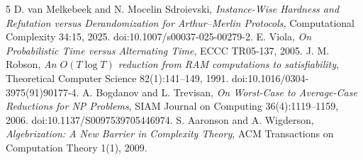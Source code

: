 \documentclass[11pt]{article}
\begin{document}
\begin{thebibliography}{5}
 D. van Melkebeek and N. Mocelin Sdroievski, \emph{Instance-Wise Hardness and Refutation versus Derandomization for Arthur--Merlin Protocols}, Computational Complexity 34:15, 2025. doi:10.1007/s00037-025-00279-2.
 E. Viola, \emph{On Probabilistic Time versus Alternating Time}, ECCC TR05-137, 2005.
 J. M. Robson, \emph{An $O(T\log T)$ reduction from RAM computations to satisfiability}, Theoretical Computer Science 82(1):141--149, 1991. doi:10.1016/0304-3975(91)90177-4.
 A. Bogdanov and L. Trevisan, \emph{On Worst-Case to Average-Case Reductions for NP Problems}, SIAM Journal on Computing 36(4):1119--1159, 2006. doi:10.1137/S0097539705446974.
 S. Aaronson and A. Wigderson, \emph{Algebrization: A New Barrier in Complexity Theory}, ACM Transactions on Computation Theory 1(1), 2009.
\end{thebibliography}
\end{document}
